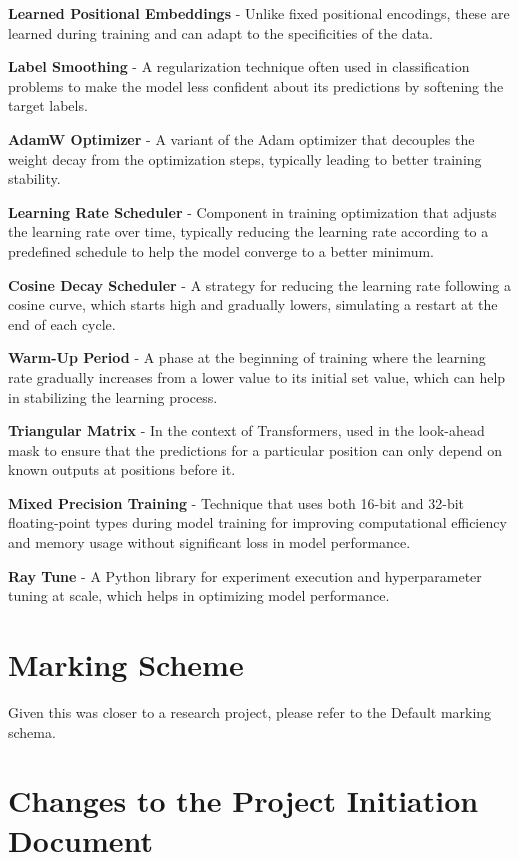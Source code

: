 \documentclass[preprint,11pt,review,authoryear]{elsarticle}
\begin{document}
\textbf{Learned Positional Embeddings} - Unlike fixed positional encodings, these are learned during training and can adapt to the specificities of the data.

\textbf{Label Smoothing} - A regularization technique often used in classification problems to make the model less confident about its predictions by softening the target labels.

\textbf{AdamW Optimizer} - A variant of the Adam optimizer that decouples the weight decay from the optimization steps, typically leading to better training stability.

\textbf{Learning Rate Scheduler} - Component in training optimization that adjusts the learning rate over time, typically reducing the learning rate according to a predefined schedule to help the model converge to a better minimum.

\textbf{Cosine Decay Scheduler} - A strategy for reducing the learning rate following a cosine curve, which starts high and gradually lowers, simulating a restart at the end of each cycle.

\textbf{Warm-Up Period} - A phase at the beginning of training where the learning rate gradually increases from a lower value to its initial set value, which can help in stabilizing the learning process.

\textbf{Triangular Matrix} - In the context of Transformers, used in the look-ahead mask to ensure that the predictions for a particular position can only depend on known outputs at positions before it.

\textbf{Mixed Precision Training} - Technique that uses both 16-bit and 32-bit floating-point types during model training for improving computational efficiency and memory usage without significant loss in model performance.

\textbf{Ray Tune} - A Python library for experiment execution and hyperparameter tuning at scale, which helps in optimizing model performance.

\newpage
\section{Marking Scheme} \label{B}
\renewcommand{\thepage}{B\arabic{page}}

Given this was closer to a research project, please refer to the Default marking schema.\newpage
\section{Changes to the Project Initiation Document} \label{C}
\renewcommand{\thepage}{C\arabic{page}}
\end{document}
